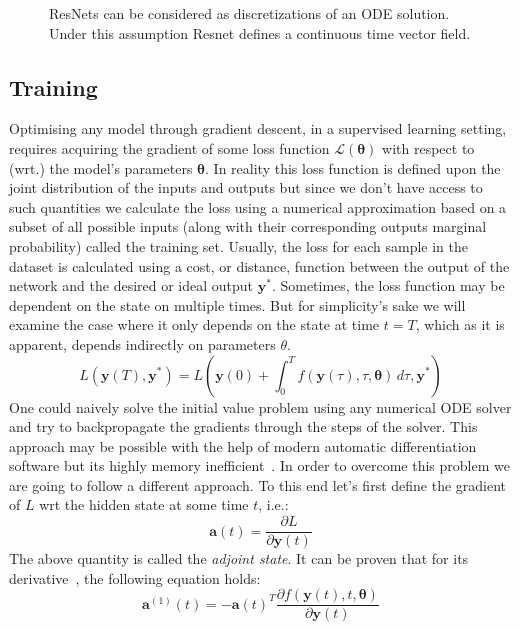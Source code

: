 \documentclass[11pt]{report}
\begin{document}
    \begin{figure}[H]
        \begin{center}
            
        \end{center}
        \caption{ResNets can be considered as discretizations of an ODE solution. Under this assumption Resnet
        defines a continuous time vector field.}
        \label{fig:resnet_to_node}
    \end{figure}

    \subsection{Training}
    Optimising any model through gradient descent, in a supervised learning setting, requires acquiring the gradient of
    some loss function $\mathcal{L}(\pmb{\theta})$ with respect to (wrt.) the model's parameters $\pmb{\theta}$.
    In reality this loss function is defined upon the joint distribution of the inputs and outputs but since we don't
    have access to such quantities we calculate the loss using a numerical approximation based on a subset of all
    possible inputs (along with their corresponding outputs marginal probability) called the training set.
    Usually, the loss for each sample in the dataset is calculated using a cost, or distance, function between the
    output of the network and the desired or ideal output $\pmb{y}^*$.
    Sometimes, the loss function may be dependent on the state on multiple times.
    But for simplicity's sake we will examine the case where it only depends on the state at time $t=T$,
    which as it is apparent, depends indirectly on parameters $\theta$.
    \begin{equation}
        L(\pmb{y}(T), \pmb{y}^*) = L \left( \pmb{y}(0) +\int_{0}^{T} f(\pmb{y}(\tau), \tau, \pmb{\theta}) \,d\tau , \pmb{y}^* \right)
        \label{eq:ode_loss}
    \end{equation}
    One could naively solve the initial value problem using any numerical ODE solver and try to backpropagate the gradients through the steps of the solver.
    This approach may be possible with the help of modern automatic differentiation software but its highly memory inefficient~\cite{matsubara2021symplectic}.
    In order to overcome this problem we are going to follow a different approach.
    To this end let's first define the gradient of $L$ wrt the hidden state at some time $t$, i.e.:
    \begin{equation}
        \pmb a(t) = \frac{\partial L}{\partial \pmb{y}(t) }
    \end{equation}
    The above quantity is called the \textit{adjoint state}.
    It can be proven that for its derivative~\cite{pontryagin2018mathematical}, the following equation holds:
    \begin{equation}
        \pmb{a}^{(1)}(t)
        =
        - \pmb{a}(t)^T
        \frac
        {\partial f( \pmb{y}(t), t, \pmb{\theta} )}
        {\partial \pmb{y}(t) }
        \label{adjoint}
    \end{equation}
\end{document}
